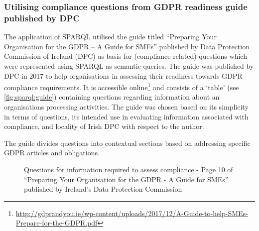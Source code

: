 \subsubsection{Utilising compliance questions from GDPR readiness guide published by DPC}
The application of SPARQL utilised the guide titled ``Preparing Your Organisation for the GDPR – A Guide for SMEs'' published by Data Protection Commission of Ireland (DPC) as basis for (compliance related) questions which were represented using SPARQL as semantic queries.
The guide was published by DPC in 2017 to help organisations in assessing their readiness towards GDPR compliance requirements.
It is accessible online\footnote{\url{http://gdprandyou.ie/wp-content/uploads/2017/12/A-Guide-to-help-SMEs-Prepare-for-the-GDPR.pdf}} and consists of a `table' (see  \autoref{fig:sparql:guide}) containing questions regarding information about an organisations processing activities.
The guide was chosen based on its simplicity in terms of questions, its intended use in evaluating information associated with compliance, and locality of Irish DPC with respect to the author. 

The guide divides questions into contextual sections based on addressing specific GDPR articles and obligations.
\begin{figure}[htbp]
\centering
{}
\caption{Questions for information required to assess compliance - Page 10 of ``Preparing Your Organisation for the GDPR - A Guide for SMEs'' published by Ireland's Data Protection Commission}
\label{fig:sparql:guide}
\end{figure}

